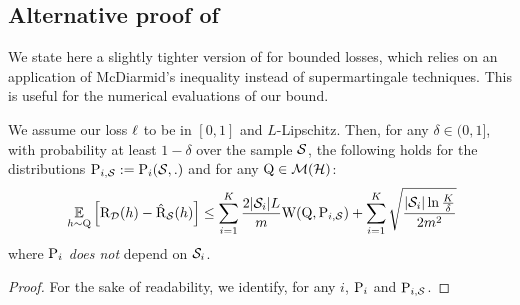 \begin{noaddcontents}
    
    \subsection{Alternative proof of }
    \label{sec:alt-proof-supervised}
    
    
    We state here a slightly tighter version of  for bounded losses, which relies on an application of McDiarmid's inequality instead of supermartingale techniques.
    This is useful for the numerical evaluations of our bound.
    
    \begin{theorem}\label{theorem:supervised_tight}
    We assume our loss $\loss$ to be in $[0,1]$ and $L$-Lipschitz.
    Then, for any $\delta\in(0,1]$, with probability at least $1-\delta$ over the sample $\S$, the following holds for the distributions $\P_{i,\S}\defeq \P_i(\S,.)$ and for any $\Q\in\Mcal(\H)$:
    \begin{align*}
    \ \EE_{h\sim\Q}\Big[ \Risk_{\D}(h) - \Riskhat_{\S}(h) \Big] \le \sum_{i=1}^{K} \frac{2|\S_i|L}{m} \W(\Q, \P_{i,\S}) + \sum_{i=1}^{K} \sqrt{\frac{|\S_i|\ln\frac{K}{\delta}}{2m^2}} 
    \end{align*}
    where $\P_i$ {\it does not} depend on $\S_i$.
    \end{theorem}
    \begin{proof}
    For the sake of readability, we identify, for any $i$, $\P_i $ and $\P_{i,\S}$.
    

\end{proof}
\end{noaddcontents}
